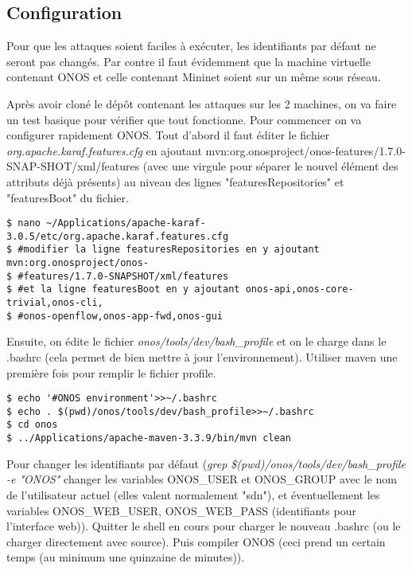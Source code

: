 \subsection{Configuration}

Pour que les attaques soient faciles à exécuter, les identifiants par défaut ne seront pas changés. Par contre il faut évidemment que la machine virtuelle contenant ONOS et celle contenant Mininet soient sur un même sous réseau.

Après avoir cloné le dépôt contenant les attaques sur les 2 machines, on va faire un test basique pour vérifier que tout fonctionne. Pour commencer on va configurer rapidement ONOS. Tout d'abord il faut éditer le fichier \textit{org.apache.karaf.features.cfg} en ajoutant mvn:org.onosproject/onos-features/1.7.0-SNAP-SHOT/xml/features (avec une virgule pour séparer le nouvel élément des attributs déjà présents) au niveau des lignes "featuresRepositories" et "featuresBoot" du fichier.

\begin{verbatim}
$ nano ~/Applications/apache-karaf-3.0.5/etc/org.apache.karaf.features.cfg
$ #modifier la ligne featuresRepositories en y ajoutant mvn:org.onosproject/onos-
$ #features/1.7.0-SNAPSHOT/xml/features
$ #et la ligne featuresBoot en y ajoutant onos-api,onos-core-trivial,onos-cli,
$ #onos-openflow,onos-app-fwd,onos-gui
\end{verbatim}

Ensuite, on édite le fichier \textit{onos/tools/dev/bash\_profile} et on le charge dans le .bashrc (cela permet de bien mettre à jour l'environnement). Utiliser maven une première fois pour remplir le fichier profile.

\begin{verbatim}
$ echo '#ONOS environment'>>~/.bashrc
$ echo . $(pwd)/onos/tools/dev/bash_profile>>~/.bashrc
$ cd onos
$ ../Applications/apache-maven-3.3.9/bin/mvn clean
\end{verbatim}

Pour changer les identifiants par défaut (\textit{grep \$(pwd)/onos/tools/dev/bash\_profile -e "ONOS"} changer les variables ONOS\_USER et ONOS\_GROUP avec le nom de l'utilisateur actuel (elles valent normalement "sdn"), et éventuellement les variables ONOS\_WEB\_USER, ONOS\_WEB\_PASS (identifiants pour l'interface web)).
Quitter le shell en cours pour charger le nouveau .bashrc (ou le charger directement avec source).
Puis compiler ONOS (ceci prend un certain temps (au minimum une quinzaine de minutes)).

